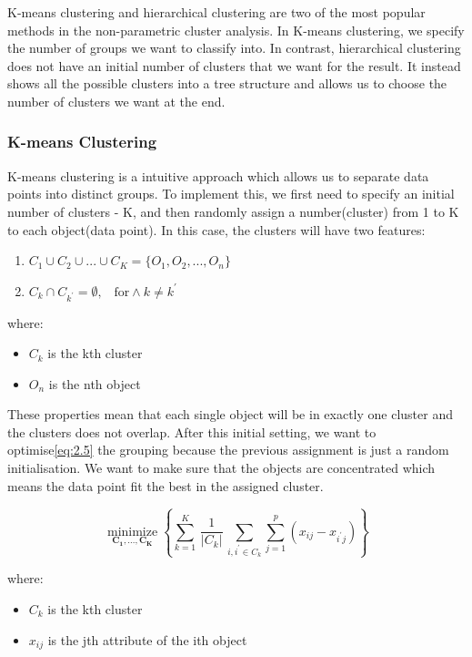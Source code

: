 \documentclass[11pt]{article} %
\theoremstyle{plain}
\theoremstyle{definition}
\begin{document}
K-means clustering and hierarchical clustering are two of the most popular methods in the non-parametric cluster analysis. In K-means clustering, we specify the number of groups we want to classify into. In contrast, hierarchical clustering does not have an initial number of clusters that we want for the result. It instead shows all the possible clusters into a tree structure and allows us to choose the number of clusters we want at the end.

\subsubsection{K-means Clustering}

K-means clustering is a intuitive approach which allows us to separate data points into distinct groups. To implement this, we first need to specify an initial number of clusters - K, and then randomly assign a number(cluster) from 1 to K to each object(data point). In this case, the clusters will have two features\cite{james/itsl:2009}:
{
  \begin{enumerate}
    \item ${C_1}\cup{C_2}\cup...\cup{C_K} = \{{O_1}, {O_2},..., {O_n}\}$
    \item ${C_k}\cap{C_{k^\prime}} = \emptyset \text{,}\quad \text{for} \wedge k \neq k^\prime$
  \end{enumerate}

  \footnotesize
  where:
    \begin{itemize}[label=-, leftmargin=4em, itemsep=0.1em]
      \item ${C_k}$ is the kth cluster
      \item ${O_n}$ is the nth object
    \end{itemize}
}

These properties mean that each single object will be in exactly one cluster and the clusters does not overlap. After this initial setting, we want to optimise\eqref{eq:2.5} the grouping because the previous assignment is just a random initialisation. We want to make sure that the objects are concentrated which means the data point fit the best in the assigned cluster. 

{
  \begin{equation}
    \label{eq:2.5}
    \tag{2.5}
    {{\underset {\mathbf {C_1,...,C_K} }{\operatorname {minimize} }}\left\{\sum _{k=1}^{K}\,{\frac {1}{|C_{k}|}}\,\sum _{ {i} , {i^\prime} \in C_{k}}\sum_{j=1}^{p}(x_{ij}-x_{{i^\prime}j})\right\}}
  \end{equation}

  \footnotesize
  where:
  \begin{itemize}[label=-, leftmargin=4em, itemsep=0.1em]
    \item ${C_k}$ is the kth cluster
    \item ${x_{ij}}$ is the jth attribute of the ith object
  \end{itemize}
}
\end{document}
